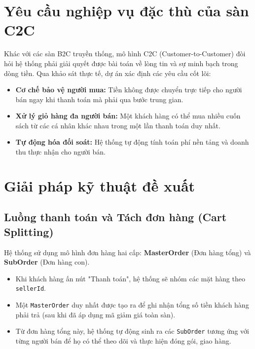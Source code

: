 \documentclass[../main.tex]{subfiles}
\begin{document}
\section{Yêu cầu nghiệp vụ đặc thù của sàn C2C}
Khác với các sàn B2C truyền thống, mô hình C2C (Customer-to-Customer) đòi hỏi hệ thống phải giải quyết được bài toán về lòng tin và sự minh bạch trong dòng tiền. Qua khảo sát thực tế, dự án xác định các yêu cầu cốt lõi:
\begin{itemize}
    \item \textbf{Cơ chế bảo vệ người mua:} Tiền không được chuyển trực tiếp cho người bán ngay khi thanh toán mà phải qua bước trung gian.
    \item \textbf{Xử lý giỏ hàng đa người bán:} Một khách hàng có thể mua nhiều cuốn sách từ các cá nhân khác nhau trong một lần thanh toán duy nhất.
    \item \textbf{Tự động hóa đối soát:} Hệ thống tự động tính toán phí nền tảng và doanh thu thực nhận cho người bán.
\end{itemize}

\section{Giải pháp kỹ thuật đề xuất}

\subsection{Luồng thanh toán và Tách đơn hàng (Cart Splitting)}
Hệ thống sử dụng mô hình đơn hàng hai cấp: \textbf{MasterOrder} (Đơn hàng tổng) và \textbf{SubOrder} (Đơn hàng con).
\begin{itemize}
    \item Khi khách hàng ấn nút "Thanh toán", hệ thống sẽ nhóm các mặt hàng theo \texttt{sellerId}.
    \item Một \texttt{MasterOrder} duy nhất được tạo ra để ghi nhận tổng số tiền khách hàng phải trả (sau khi đã áp dụng mã giảm giá toàn sàn).
    \item Từ đơn hàng tổng này, hệ thống tự động sinh ra các \texttt{SubOrder} tương ứng với từng người bán để họ có thể theo dõi và thực hiện đóng gói, giao hàng.
\end{itemize}
\end{document}
